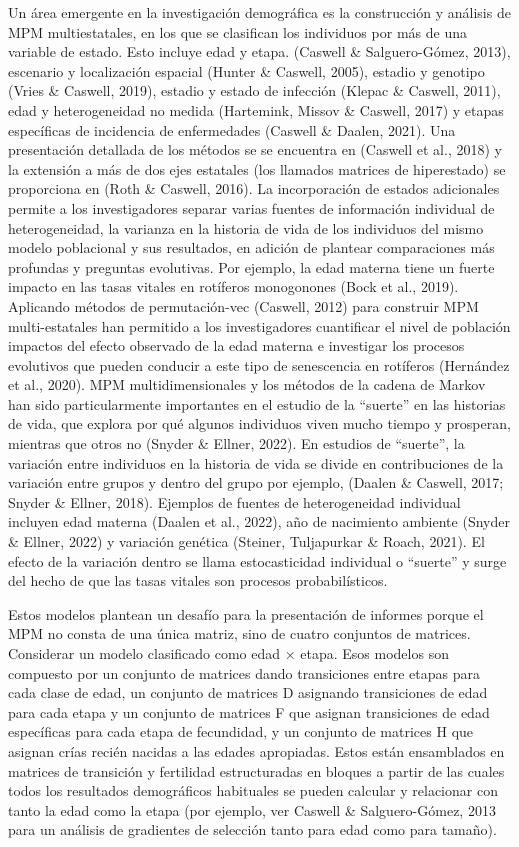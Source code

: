 \documentclass[
  12pt,
  letterpaper,
]{book}
\begin{document}
Un área emergente en la investigación demográfica es la construcción y
análisis de MPM multiestatales, en los que se clasifican los individuos
por más de una variable de estado. Esto incluye edad y etapa. (Caswell
\& Salguero-Gómez, 2013), escenario y localización espacial (Hunter \&
Caswell, 2005), estadio y genotipo (Vries \& Caswell, 2019), estadio y
estado de infección (Klepac \& Caswell, 2011), edad y heterogeneidad no
medida (Hartemink, Missov \& Caswell, 2017) y etapas específicas de
incidencia de enfermedades (Caswell \& Daalen, 2021). Una presentación
detallada de los métodos se se encuentra en (Caswell et al., 2018) y la
extensión a más de dos ejes estatales (los llamados matrices de
hiperestado) se proporciona en (Roth \& Caswell, 2016). La incorporación
de estados adicionales permite a los investigadores separar varias
fuentes de información individual de heterogeneidad, la varianza en la
historia de vida de los individuos del mismo modelo poblacional y sus
resultados, en adición de plantear comparaciones más profundas y
preguntas evolutivas. Por ejemplo, la edad materna tiene un fuerte
impacto en las tasas vitales en rotíferos monogonones (Bock et al.,
2019). Aplicando métodos de permutación-vec (Caswell, 2012) para
construir MPM multi-estatales han permitido a los investigadores
cuantificar el nivel de población impactos del efecto observado de la
edad materna e investigar los procesos evolutivos que pueden conducir a
este tipo de senescencia en rotíferos (Hernández et al., 2020). MPM
multidimensionales y los métodos de la cadena de Markov han sido
particularmente importantes en el estudio de la ``suerte'' en las
historias de vida, que explora por qué algunos individuos viven mucho
tiempo y prosperan, mientras que otros no (Snyder \& Ellner, 2022). En
estudios de ``suerte'', la variación entre individuos en la historia de
vida se divide en contribuciones de la variación entre grupos y dentro
del grupo por ejemplo, (Daalen \& Caswell, 2017; Snyder \& Ellner,
2018). Ejemplos de fuentes de heterogeneidad individual incluyen edad
materna (Daalen et al., 2022), año de nacimiento ambiente (Snyder \&
Ellner, 2022) y variación genética (Steiner, Tuljapurkar \& Roach,
2021). El efecto de la variación dentro se llama estocasticidad
individual o ``suerte'' y surge del hecho de que las tasas vitales son
procesos probabilísticos.

Estos modelos plantean un desafío para la presentación de informes
porque el MPM no consta de una única matriz, sino de cuatro conjuntos de
matrices. Considerar un modelo clasificado como edad × etapa. Esos
modelos son compuesto por un conjunto de matrices dando transiciones
entre etapas para cada clase de edad, un conjunto de matrices D
asignando transiciones de edad para cada etapa y un conjunto de matrices
F que asignan transiciones de edad específicas para cada etapa de
fecundidad, y un conjunto de matrices H que asignan crías recién nacidas
a las edades apropiadas. Estos están ensamblados en matrices de
transición y fertilidad estructuradas en bloques a partir de las cuales
todos los resultados demográficos habituales se pueden calcular y
relacionar con tanto la edad como la etapa (por ejemplo, ver Caswell \&
Salguero-Gómez, 2013 para un análisis de gradientes de selección tanto
para edad como para tamaño).
\end{document}
